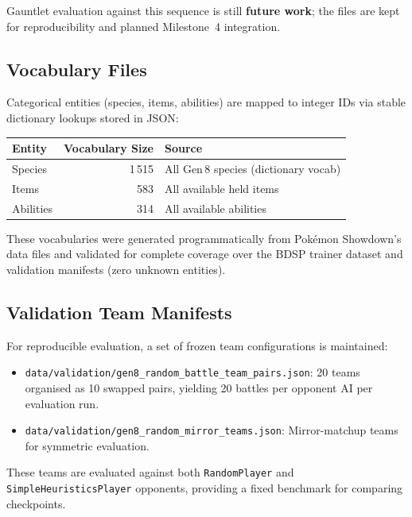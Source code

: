 Gauntlet evaluation against this sequence is still \textbf{future work}; the files are
kept for reproducibility and planned Milestone~4 integration.

\subsection{Vocabulary Files}

Categorical entities (species, items, abilities) are mapped to integer IDs via
stable dictionary lookups stored in JSON:

\begin{center}
\small
\begin{tabularx}{0.8\textwidth}{l r l}
  \toprule
  \textbf{Entity} & \textbf{Vocabulary Size} & \textbf{Source} \\
  \midrule
  Species  & 1\,515 & All Gen\,8 species (dictionary vocab) \\
  Items    & 583   & All available held items \\
  Abilities & 314   & All available abilities \\
  \bottomrule
\end{tabularx}
\end{center}

These vocabularies were generated programmatically from Pok\'{e}mon Showdown's
data files and validated for complete coverage over the BDSP trainer dataset
and validation manifests (zero unknown entities).

\subsection{Validation Team Manifests}

For reproducible evaluation, a set of frozen team configurations is maintained:

\begin{itemize}
  \item \texttt{data/validation/gen8\_random\_battle\_team\_pairs.json}:
        20 teams organised as 10 swapped pairs, yielding 20 battles per opponent AI per
        evaluation run.
  \item \texttt{data/validation/gen8\_random\_mirror\_teams.json}:
        Mirror-matchup teams for symmetric evaluation.
\end{itemize}

These teams are evaluated against both \texttt{RandomPlayer} and
\texttt{SimpleHeuristicsPlayer} opponents, providing a fixed benchmark for
comparing checkpoints.

